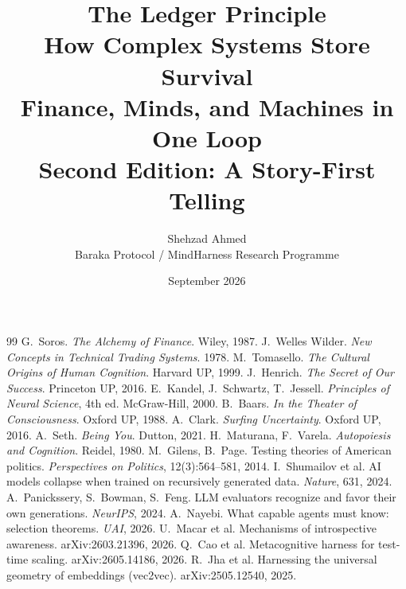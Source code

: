 \documentclass[11pt,openany]{book}
\title{The Ledger Principle\\[4pt]
\Large How Complex Systems Store Survival\\[4pt]
\normalsize Finance, Minds, and Machines in One Loop\\[4pt]
\large Second Edition: A Story-First Telling}
\author{Shehzad Ahmed \\ \small Baraka Protocol / MindHarness Research Programme}
\date{September 2026}
\begin{document}
\maketitle
\tableofcontents
\listoffigures
\listoftables

















\begin{thebibliography}{99}
 G.\ Soros. \textit{The Alchemy of Finance}. Wiley, 1987.
 J.\ Welles Wilder. \textit{New Concepts in Technical Trading Systems}. 1978.
 M.\ Tomasello. \textit{The Cultural Origins of Human Cognition}. Harvard UP, 1999.
 J.\ Henrich. \textit{The Secret of Our Success}. Princeton UP, 2016.
 E.\ Kandel, J.\ Schwartz, T.\ Jessell. \textit{Principles of Neural Science}, 4th ed. McGraw-Hill, 2000.
 B.\ Baars. \textit{In the Theater of Consciousness}. Oxford UP, 1988.
 A.\ Clark. \textit{Surfing Uncertainty}. Oxford UP, 2016.
 A.\ Seth. \textit{Being You}. Dutton, 2021.
 H.\ Maturana, F.\ Varela. \textit{Autopoiesis and Cognition}. Reidel, 1980.
 M.\ Gilens, B.\ Page. Testing theories of American politics. \textit{Perspectives on Politics}, 12(3):564--581, 2014.
 I.\ Shumailov et al. AI models collapse when trained on recursively generated data. \textit{Nature}, 631, 2024.
 A.\ Panickssery, S.\ Bowman, S.\ Feng. LLM evaluators recognize and favor their own generations. \textit{NeurIPS}, 2024.
 A.\ Nayebi. What capable agents must know: selection theorems. \textit{UAI}, 2026.
 U.\ Macar et al. Mechanisms of introspective awareness. arXiv:2603.21396, 2026.
 Q.\ Cao et al. Metacognitive harness for test-time scaling. arXiv:2605.14186, 2026.
 R.\ Jha et al. Harnessing the universal geometry of embeddings (vec2vec). arXiv:2505.12540, 2025.

\end{thebibliography}
\end{document}
